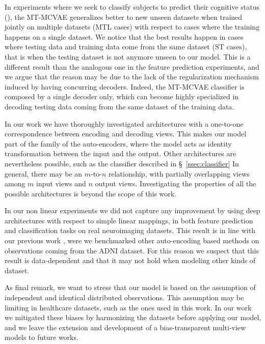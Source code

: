 In experiments where we seek to classify subjects to predict their cognitive status (),
the MT-MCVAE generalizes better to new unseen datasets when trained jointly on multiple datasets (MTL cases) with respect to cases where the training happens on a single dataset.
We notice that the best results happen in cases where testing data and training data come from the same dataset (ST cases), that is when the testing dataset is not anymore unseen to our model.
This is a different result than the analogous one in the feature prediction experiments, and we argue that the reason may be due to the lack of the regularization mechanism induced by having concurring decoders.
Indeed, the MT-MCVAE classifier is composed by a single decoder only, which can become highly specialized in decoding testing data coming from the same dataset of the training data.

In our work we have thoroughly investigated architectures with a one-to-one correspondence between encoding and decoding views.
This makes our model part of the family of the auto-encoders, where the model acts as identity transformation between the input and the output.
Other architectures are nevertheless possible, such as the classifier described in \S~\ref{ssec:classifier}
In general, there may be an $m$-to-$n$ relationship, with partially overlapping views among $m$ input views and $n$ output views.
Investigating the properties of all the possible architectures is beyond the scope of this work.

In our non linear experiments we did not capture any improvement by using deep architectures with respect to simple linear mappings,
in both feature prediction and classification tasks on real neuroimaging datasets.
This result is in line with our previous work \citep{Antelmi2019}, were we benchmarked other auto-encoding based methods on observations coming from the ADNI dataset.
For this reason we suspect that this result is data-dependent and that it may not hold when modeling other kinds of dataset.

As final remark, we want to stress that our model is based on the assumption of independent and identical distributed observations.
This assumption may be limiting in healthcare datasets, such as the ones used in this work.
In our work we mitigated these biases by harmonizing the datasets before applying our model, and we leave the extension and development of a bias-transparent multi-view models to future works.

